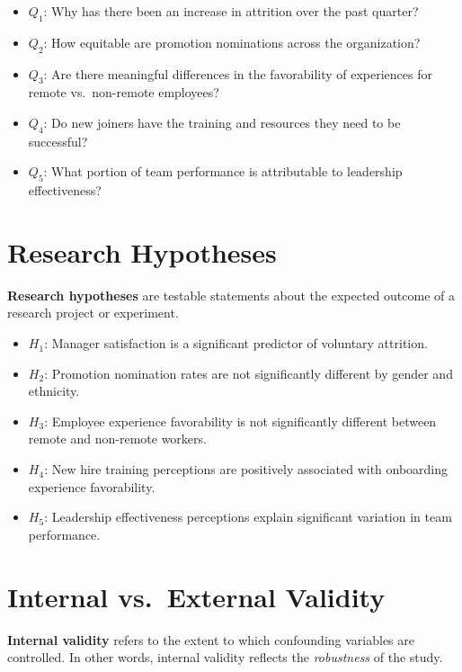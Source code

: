 \documentclass[
]{book}
\providecommand{\tightlist}{%
  \setlength{\itemsep}{0pt}\setlength{\parskip}{0pt}}
\begin{document}
\begin{itemize}
\tightlist
\item
  \(Q_1\): Why has there been an increase in attrition over the past quarter?
\item
  \(Q_2\): How equitable are promotion nominations across the organization?
\item
  \(Q_3\): Are there meaningful differences in the favorability of experiences for remote vs.~non-remote employees?
\item
  \(Q_4\): Do new joiners have the training and resources they need to be successful?
\item
  \(Q_5\): What portion of team performance is attributable to leadership effectiveness?
\end{itemize}

\hypertarget{research-hypotheses}{%
\section{Research Hypotheses}\label{research-hypotheses}}

\textbf{Research hypotheses} are testable statements about the expected outcome of a research project or experiment.

\begin{itemize}
\tightlist
\item
  \(H_1\): Manager satisfaction is a significant predictor of voluntary attrition.
\item
  \(H_2\): Promotion nomination rates are not significantly different by gender and ethnicity.
\item
  \(H_3\): Employee experience favorability is not significantly different between remote and non-remote workers.
\item
  \(H_4\): New hire training perceptions are positively associated with onboarding experience favorability.
\item
  \(H_5\): Leadership effectiveness perceptions explain significant variation in team performance.
\end{itemize}

\hypertarget{internal-vs.-external-validity}{%
\section{Internal vs.~External Validity}\label{internal-vs.-external-validity}}

\textbf{Internal validity} refers to the extent to which confounding variables are controlled. In other words, internal validity reflects the \emph{robustness} of the study.
\end{document}
